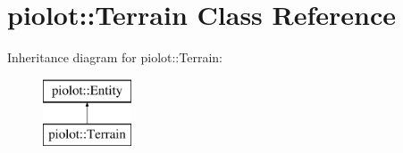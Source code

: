 \hypertarget{classpiolot_1_1_terrain}{}\section{piolot\+:\+:Terrain Class Reference}
\label{classpiolot_1_1_terrain}
Inheritance diagram for piolot\+:\+:Terrain\+:\begin{figure}[H]
\begin{center}
\leavevmode
\includegraphics[height=2.000000cm]{classpiolot_1_1_terrain}
\end{center}
\end{figure}
